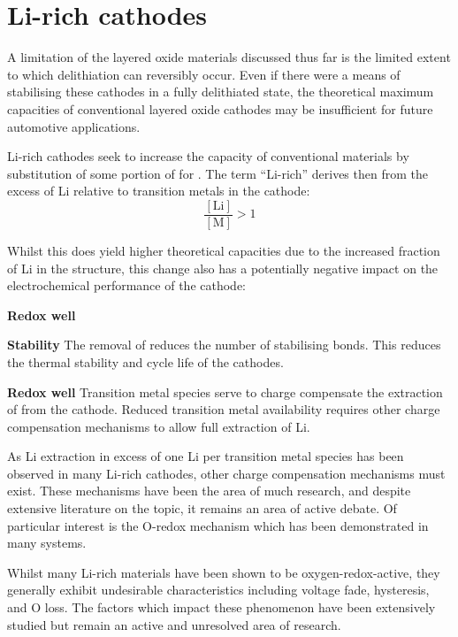 \section{Li-rich cathodes}
A limitation of the layered oxide materials discussed thus far is the limited extent to which delithiation can reversibly occur.
Even if there were a means of stabilising these cathodes in a fully delithiated state, the theoretical maximum capacities of conventional layered oxide cathodes may be insufficient for future automotive applications.

Li-rich cathodes seek to increase the capacity of conventional  materials by substitution of some portion of  for .
The term ``Li-rich'' derives then from the excess of Li relative to transition metals in the cathode:
\begin{equation}
	\frac{[\textrm{Li}]}{[\textrm{M}]} > 1
\end{equation}

Whilst this does yield higher theoretical capacities due to the increased fraction of Li in the structure, this change also has a potentially negative impact on the electrochemical performance of the cathode:
\begin{labeling}{\textbf{Redox well}}
	\item [\textbf{Stability}] The removal of  reduces the number of stabilising  bonds.
	This reduces the thermal stability and cycle life of the cathodes.
	\item [\textbf{Redox well}] Transition metal species serve to charge compensate the extraction of  from the cathode.
	Reduced transition metal availability requires other charge compensation mechanisms to allow full extraction of Li.
	\end{labeling}

As Li extraction in excess of one Li per transition metal species has been observed in many Li-rich cathodes, other charge compensation mechanisms must exist.
These mechanisms have been the area of much research, and despite extensive literature on the topic,\cite{Rozier2015,Csernica2019, Li2018a, Seo2016} it remains an area of active debate.
Of particular interest is the O-redox mechanism which has been demonstrated in many systems.\cite{Li2018a}

Whilst many Li-rich materials have been shown to be oxygen-redox-active, they generally exhibit undesirable characteristics including voltage fade, hysteresis, and O loss.\cite{Csernica2019}
The factors which impact these phenomenon have been extensively studied but remain an active and unresolved area of research.\cite{Rozier2015,Csernica2019, Li2018a, Seo2016}
\newpage
